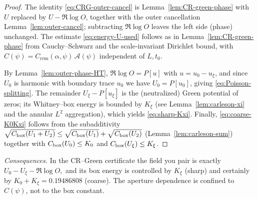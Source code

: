 \documentclass[11pt]{article}
\providecommand{\CboxZeta}{K_0 + K_\xi}%
\renewcommand{\CboxZeta}{0.19486808}
\theoremstyle{definition}
\theoremstyle{remark}
\newcommand{\Poisson}{P}
\begin{document}
\begin{proof}
The identity \eqref{eq:CRG-outer-cancel} is Lemma~\ref{lem:CR-green-phase} with $U$ replaced by $U-\Re\log O$, together with the outer cancellation Lemma~\ref{lem:outer-cancel}; subtracting $\Re\log O$ leaves the left side (phase) unchanged. The estimate \eqref{eq:energy-U-used} follows as in Lemma~\ref{lem:CR-green-phase} from Cauchy--Schwarz and the scale‑invariant Dirichlet bound, with $C(\psi)=C_{\mathrm{rem}}(\alpha,\psi)\,\mathcal A(\psi)$ independent of $L,t_0$.

By Lemma~\ref{lem:outer-phase-HT}, $\Re\log O=\Poisson[u]$ with $u=u_0-u_\xi$, and since $U_0$ is harmonic with boundary trace $u_0$ we have $U_0=\Poisson[u_0]$, giving \eqref{eq:Poisson-splitting}. The remainder $U_\xi-\Poisson[u_\xi]$ is the (neutralized) Green potential of zeros; its Whitney–box energy is bounded by $K_\xi$ (see Lemma~\ref{lem:carleson-xi} and the annular $L^2$ aggregation), which yields \eqref{eq:sharp-Kxi}. Finally, \eqref{eq:coarse-K0Kxi} follows from the subadditivity
\(
\sqrt{C_{\rm box}(U_1+U_2)}\le \sqrt{C_{\rm box}(U_1)}+\sqrt{C_{\rm box}(U_2)}
\)
(Lemma~\ref{lem:carleson-sum}) together with $C_{\rm box}(U_0)\le K_0$ and $C_{\rm box}(U_\xi)\le K_\xi$.
\end{proof}

\noindent\emph{Consequences.}
In the CR–Green certificate the field you pair is exactly
\(
U_0-U_\xi-\Re\log O,
\)
and its box energy is controlled by $K_\xi$ (sharp) and certainly by $K_0+K_\xi=\CboxZeta$ (coarse).
The aperture dependence is confined to $C(\psi)$, not to the box constant.

\end{document}
